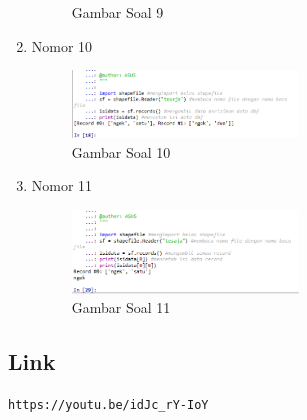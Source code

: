 \begin{enumerate}
\begin{figure}[H]
  \centering
  \caption{Gambar Soal 9}
 \end{figure}
 \item Nomor 10
 
 \begin{figure}[H]
  \includegraphics[width=6cm]{figures/Tugas3/1174077/no10.png}
  \centering
  \caption{Gambar Soal 10 }
 \end{figure}
 \item Nomor 11
 
 \begin{figure}[H]
  \includegraphics[width=6cm]{figures/Tugas3/1174077/no11.png}
  \centering
  \caption{Gambar Soal 11 }
 \end{figure}
\end{enumerate}
\subsection{Link}
\verb|https://youtu.be/idJc_rY-IoY|